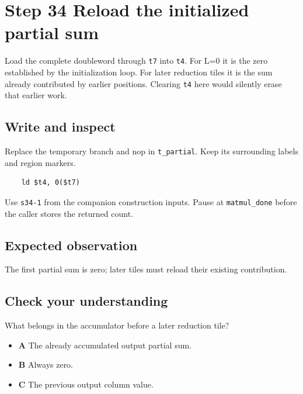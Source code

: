 \section{Step 34 Reload the initialized partial sum}\label{matmul-s34}

Load the complete doubleword through \texttt{t7} into \texttt{t4}. For L=0 it is the zero established by the initialization loop. For later reduction tiles it is the sum already contributed by earlier positions. Clearing \texttt{t4} here would silently erase that earlier work.

\subsection{Write and inspect}
Replace the temporary branch and nop in \texttt{t\_partial}. Keep its surrounding labels and region markers.

\begin{verbatim}
    ld $t4, 0($t7)
\end{verbatim}
Use \texttt{s34-1} from the companion construction inputs. Pause at \texttt{matmul\_done} before the caller stores the returned count.

\subsection{Expected observation}
The first partial sum is zero; later tiles must reload their existing contribution.

\subsection{Check your understanding}
What belongs in the accumulator before a later reduction tile?

\begin{itemize}
\item \textbf{A} The already accumulated output partial sum.
\item \textbf{B} Always zero.
\item \textbf{C} The previous output column value.
\end{itemize}
